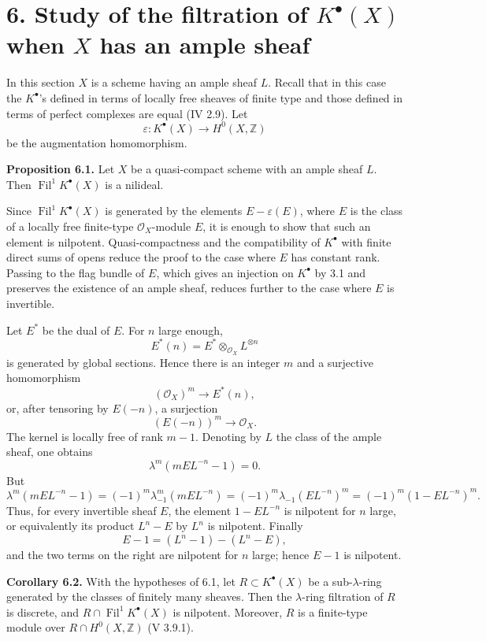 \documentclass[11pt]{article}
\newcommand{\Fil}{\operatorname{Fil}}
\begin{document}
\section*{6. Study of the filtration of \(K^\bullet(X)\) when \(X\) has an ample sheaf}

In this section \(X\) is a scheme having an ample sheaf \(L\). Recall that in this case the \(K^\bullet\)'s defined in terms of locally free sheaves of finite type and those defined in terms of perfect complexes are equal (IV 2.9). Let
\[
  \varepsilon:K^\bullet(X)\longrightarrow H^0(X,\mathbb Z)
\]
be the augmentation homomorphism.

\textbf{Proposition 6.1.} Let \(X\) be a quasi-compact scheme with an ample sheaf \(L\). Then \(\Fil^1K^\bullet(X)\) is a nilideal.

Since \(\Fil^1K^\bullet(X)\) is generated by the elements \(E-\varepsilon(E)\), where \(E\) is the class of a locally free finite-type \(\mathcal O_X\)-module \(E\), it is enough to show that such an element is nilpotent. Quasi-compactness and the compatibility of \(K^\bullet\) with finite direct sums of opens reduce the proof to the case where \(E\) has constant rank. Passing to the flag bundle of \(E\), which gives an injection on \(K^\bullet\) by 3.1 and preserves the existence of an ample sheaf, reduces further to the case where \(E\) is invertible.

Let \(E^*\) be the dual of \(E\). For \(n\) large enough,
\[
  E^*(n)=E^*\otimes_{\mathcal O_X}L^{\otimes n}
\]
is generated by global sections. Hence there is an integer \(m\) and a surjective homomorphism
\[
  (\mathcal O_X)^m\longrightarrow E^*(n),
\]
or, after tensoring by \(E(-n)\), a surjection
\[
  (E(-n))^m\longrightarrow \mathcal O_X .
\]
The kernel is locally free of rank \(m-1\). Denoting by \(L\) the class of the ample sheaf, one obtains
\[
  \lambda^m(mEL^{-n}-1)=0.
\]
But
\[
 \lambda^m(mEL^{-n}-1)=(-1)^m\lambda_{-1}^m(mEL^{-n})
 =(-1)^m\lambda_{-1}(EL^{-n})^m
 =(-1)^m(1-EL^{-n})^m.
\]
Thus, for every invertible sheaf \(E\), the element \(1-EL^{-n}\) is nilpotent for \(n\) large, or equivalently its product \(L^n-E\) by \(L^n\) is nilpotent. Finally
\[
  E-1=(L^n-1)-(L^n-E),
\]
and the two terms on the right are nilpotent for \(n\) large; hence \(E-1\) is nilpotent.

\textbf{Corollary 6.2.} With the hypotheses of 6.1, let \(R\subset K^\bullet(X)\) be a sub-\(\lambda\)-ring generated by the classes of finitely many sheaves. Then the \(\lambda\)-ring filtration of \(R\) is discrete, and \(R\cap\Fil^1K^\bullet(X)\) is nilpotent. Moreover, \(R\) is a finite-type module over \(R\cap H^0(X,\mathbb Z)\) (V 3.9.1).
\end{document}
